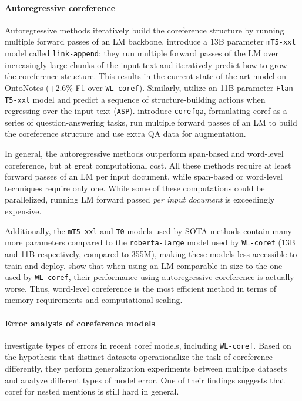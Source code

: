 \documentclass[11pt]{article}
\newcommand\wlcoref{{\texttt{WL-coref}}}
\begin{document}
\paragraph{Autoregressive coreference} Autoregressive methods iteratively build the coreference structure by running multiple forward passes of an LM backbone. \citet{bohnet2023coreference} introduce a 13B parameter \texttt{mT5-xxl} model called \texttt{link-append}: they run multiple forward passes of the LM over increasingly large chunks of the input text and iteratively predict how to grow the coreference structure. This results in the current state-of-the art model on OntoNotes (+2.6\% F1 over \wlcoref{}). Similarly, \citet{liu2022autoregressive} utilize an 11B parameter \texttt{Flan-T5-xxl} model \citep{chung2022scaling} and predict a sequence of structure-building actions when regressing over the input text (\texttt{ASP}). \citet{wu2020corefqa} introduce \texttt{corefqa}, formulating coref as a series of question-answering tasks, run multiple forward passes of an LM to build the coreference structure and use extra QA data for augmentation.

In general, the autoregressive methods outperform span-based and word-level coreference, but at great computational cost. All these methods require at least  forward passes of an LM per input document, while span-based or word-level techniques require only one. While some of these computations could be parallelized, running  LM forward passed \emph{per input document} is exceedingly expensive.

Additionally, the \texttt{mT5-xxl} and \texttt{T0} models used by SOTA methods contain many more parameters compared to the \texttt{roberta-large} model used by \wlcoref{} (13B and 11B respectively, compared to 355M), making these models less accessible to train and deploy. \citet{liu2022autoregressive} show that when using an LM comparable in size to the one used by \wlcoref{}, their performance using autoregressive coreference is actually worse. Thus, word-level coreference is the most efficient method in terms of memory requirements and computational scaling.

\paragraph{Error analysis of coreference models} 
\citet{porada2023investigating} investigate types of errors in recent coref models, including \wlcoref{}. Based on the hypothesis that distinct datasets operationalize the task of coreference differently, they perform generalization experiments between multiple datasets and analyze different types of model error. One of their findings suggests that coref for nested mentions is still hard in general.
\end{document}
